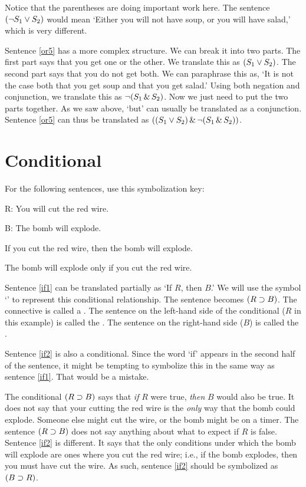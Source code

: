 Notice that the parentheses are doing important work here. The sentence $(\neg S_1 \vee S_2)$ would mean `Either you will not have soup, or you will have salad,' which is very different.

Sentence \ref{or5} has a more complex structure. We can break it into two parts. The first part says that you get one or the other. We translate this as $(S_1 \vee S_2)$. The second part says that you do not get both. We can paraphrase this as, `It is not the case both that you get soup and that you get salad.' Using both negation and conjunction, we translate this as $\neg(S_1 \,\&\, S_2)$. Now we just need to put the two parts together. As we saw above, `but' can usually be translated as a conjunction. Sentence \ref{or5} can thus be translated as $((S_1 \vee S_2) \,\&\, \neg(S_1 \,\&\, S_2))$.

\section{Conditional}
For the following sentences, use this symbolization key:

\begin{ekey}
\item[R:] You will cut the red wire.
\item[B:] The bomb will explode.
\end{ekey}

\begin{earg}
\item[\ex{if1}] If you cut the red wire, then the bomb will explode.
\item[\ex{if2}] The bomb will explode only if you cut the red wire.
\end{earg}

Sentence \ref{if1} can be translated partially as `If $R$, then $B$.' We will use the symbol `\eif' to represent this conditional relationship. The sentence becomes $(R\supset B)$. The connective is called a . The sentence on the left-hand side of the conditional ($R$ in this example) is called the . The sentence on the right-hand side ($B$) is called the .

Sentence \ref{if2} is also a conditional. Since the word `if' appears in the second half of the sentence, it might be tempting to symbolize this in the same way as sentence \ref{if1}. That would be a mistake.

The conditional $(R\supset B)$ says that \emph{if} $R$ were true, \emph{then} $B$ would also be true. It does not say that your cutting the red wire is the \emph{only} way that the bomb could explode. Someone else might cut the wire, or the bomb might be on a timer. The sentence $(R\supset B)$ does not say anything about what to expect if $R$ is false. Sentence \ref{if2} is different. It says that the only conditions under which the bomb will explode are ones where you cut the red wire; i.e., if the bomb explodes, then you must have cut the wire. As such, sentence \ref{if2} should be symbolized as $(B \supset R)$.

